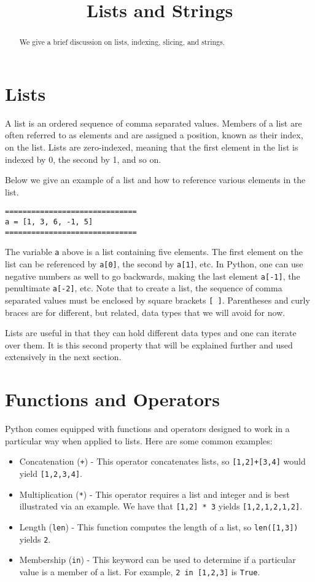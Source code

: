 \documentclass{ximera}
\title{Lists and Strings}
\begin{document}
  
\begin{abstract}  
We give a brief discussion on lists, indexing, slicing, and strings.
\end{abstract}  
\maketitle

\section{Lists}

A list is an ordered sequence of comma separated values. Members of a list are often referred to as elements and are assigned a position, known as their index, on the list. Lists are zero-indexed, meaning that the first element in the list is indexed by 0, the second by 1, and so on.

Below we give an example of a list and how to reference various elements in the list.

\begin{verbatim}
==============================
a = [1, 3, 6, -1, 5]
==============================
\end{verbatim}

The variable \verb|a| above is a list containing five elements. The first element on the list can be referenced by \verb|a[0]|, the second by \verb|a[1]|, etc. In Python, one can use negative numbers as well to go backwards, making the last element \verb|a[-1]|, the penultimate \verb|a[-2]|, etc. Note that to create a list, the sequence of comma separated values must be enclosed by square brackets \verb|[ ]|. Parentheses and curly braces are for different, but related, data types that we will avoid for now.

Lists are useful in that they can hold different data types and one can iterate over them. It is this second property that will be explained further and used extensively in the next section. 

\section{Functions and Operators}

Python comes equipped with functions and operators designed to work in a particular way when applied to lists. Here are some common examples:

\begin{itemize}
	\item Concatenation (\verb|+|) - This operator concatenates lists, so \verb|[1,2]+[3,4]| would yield \verb|[1,2,3,4]|.
	\item Multiplication (\verb|*|) - This operator requires a list and integer and is best illustrated via an example. We have that \verb|[1,2] * 3| yields \verb|[1,2,1,2,1,2]|.
	\item Length (\verb|len|) - This function computes the length of a list, so \verb|len([1,3])| yields \verb|2|.
	\item Membership (\verb|in|) - This keyword can be used to determine if a particular value is a member of a list. For example, \verb|2 in [1,2,3]| is \verb|True|.
\end{itemize}
\end{document}
